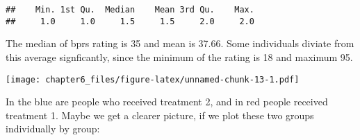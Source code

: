 \documentclass[]{article}
\newenvironment{Shaded}{\begin{snugshade}}{\end{snugshade}}
\newcommand{\DataTypeTok}[1]{\textcolor[rgb]{0.13,0.29,0.53}{#1}}
\newcommand{\DecValTok}[1]{\textcolor[rgb]{0.00,0.00,0.81}{#1}}
\newcommand{\KeywordTok}[1]{\textcolor[rgb]{0.13,0.29,0.53}{\textbf{#1}}}
\newcommand{\NormalTok}[1]{#1}
\newcommand{\OperatorTok}[1]{\textcolor[rgb]{0.81,0.36,0.00}{\textbf{#1}}}
\newcommand{\StringTok}[1]{\textcolor[rgb]{0.31,0.60,0.02}{#1}}
\begin{document}
\begin{verbatim}
##    Min. 1st Qu.  Median    Mean 3rd Qu.    Max. 
##     1.0     1.0     1.5     1.5     2.0     2.0
\end{verbatim}

\begin{Shaded}
\end{Shaded}

The median of bprs rating is 35 and mean is 37.66. Some individuals
diviate from this average signficantly, since the minimum of the rating
is 18 and maximum 95.

\begin{Shaded}
\end{Shaded}

\texttt{[image: chapter6\_files/figure-latex/unnamed-chunk-13-1.pdf]}

In the blue are people who received treatment 2, and in red people
received treatment 1. Maybe we get a clearer picture, if we plot these
two groups individually by group:
\end{document}

